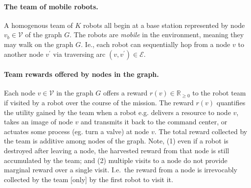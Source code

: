 \documentclass[11pt, oneside]{article}
\begin{document}

\paragraph{The team of mobile robots.}
A homogenous team of $K$ robots all begin at a base station represented by node $v_b \in \mathcal{V}$ of the graph $G$. The robots are \emph{mobile} in the environment, meaning they may walk on the graph $G$.
Ie., each robot can sequentially hop from a node $v$ to another node $v^\prime$ via traversing arc $(v, v^\prime)\in\mathcal{E}$.

\paragraph{Team rewards offered by nodes in the graph.}
Each node $v\in \mathcal{V}$ in the graph $G$ offers a reward $r(v) \in  \mathbb{R}_{\geq 0}$ to the robot team if visited by a robot over the course of the mission.
The reward $r(v)$ quantifies the utility gained by the team when a robot e.g. delivers a resource to node $v$, takes an image of node $v$ and transmits it back to the command center, or actuates some process (eg. turn a valve) at node $v$. 
The total reward collected by the team is additive among nodes of the graph. %
Note, 
(1) even if a robot is destroyed after leaving a node, the harvested reward from that node is still accumulated by the team; and
(2) multiple visits to a node do not provide marginal reward over a single visit. I.e.\ the reward from a node is irrevocably collected by the team [only] by the first robot to visit it.
\end{document}
